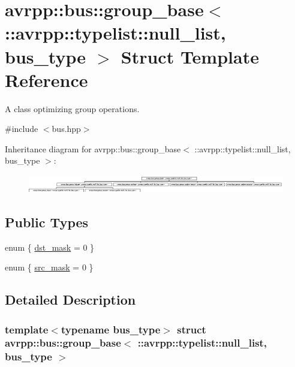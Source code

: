 \hypertarget{structavrpp_1_1bus_1_1group__base_3_01_1_1avrpp_1_1typelist_1_1null__list_00_01bus__type_01_4}{
\section{avrpp::bus::group\_\-base$<$ ::avrpp::typelist::null\_\-list, bus\_\-type $>$ Struct Template Reference}
\label{structavrpp_1_1bus_1_1group__base_3_01_1_1avrpp_1_1typelist_1_1null__list_00_01bus__type_01_4}
}


A class optimizing group operations.  




{\ttfamily \#include $<$bus.hpp$>$}

Inheritance diagram for avrpp::bus::group\_\-base$<$ ::avrpp::typelist::null\_\-list, bus\_\-type $>$:\begin{figure}[H]
\begin{center}
\leavevmode
\includegraphics[height=0.788732cm]{structavrpp_1_1bus_1_1group__base_3_01_1_1avrpp_1_1typelist_1_1null__list_00_01bus__type_01_4}
\end{center}
\end{figure}
\subsection*{Public Types}
\begin{DoxyCompactItemize}
\item 
enum \{ \hyperlink{structavrpp_1_1bus_1_1group__base_3_01_1_1avrpp_1_1typelist_1_1null__list_00_01bus__type_01_4_ada6840fd14155d54cef462101ef97e56ab1aa4b72fcc5e6b8f53dcacaac55eafc}{dst\_\-mask} =  0
 \}
\item 
enum \{ \hyperlink{structavrpp_1_1bus_1_1group__base_3_01_1_1avrpp_1_1typelist_1_1null__list_00_01bus__type_01_4_a3e7c82a1e6663b156bae4cbbc0b256c3abf82e7a0895451954e81105e7a81d0d5}{src\_\-mask} =  0
 \}
\end{DoxyCompactItemize}


\subsection{Detailed Description}
\subsubsection*{template$<$typename bus\_\-type$>$ struct avrpp::bus::group\_\-base$<$ ::avrpp::typelist::null\_\-list, bus\_\-type $>$}

